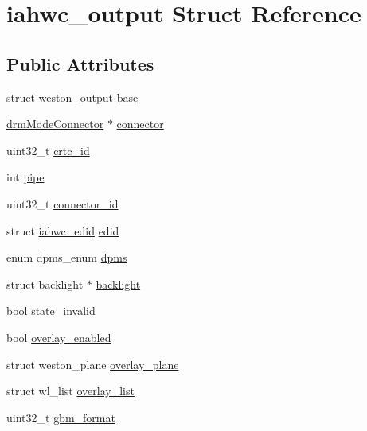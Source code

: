 \hypertarget{structiahwc__output}{}\section{iahwc\+\_\+output Struct Reference}
\label{structiahwc__output}
\subsection*{Public Attributes}
\begin{DoxyCompactItemize}
\item 
struct weston\+\_\+output \mbox{\hyperlink{structiahwc__output_a33611f9c8d1354ea9c4df7c6077f593e}{base}}
\item 
\mbox{\hyperlink{nativedisplay_8h_a16ea3fc6b16060fd1e1257707006440e}{drm\+Mode\+Connector}} $\ast$ \mbox{\hyperlink{structiahwc__output_ab3dc520b844eed75e64c4732b8355f35}{connector}}
\item 
uint32\+\_\+t \mbox{\hyperlink{structiahwc__output_a6e3ab85b62b65859fdb94afd042bfd00}{crtc\+\_\+id}}
\item 
int \mbox{\hyperlink{structiahwc__output_a34e4e1b6d16a36451f45dcd44de71592}{pipe}}
\item 
uint32\+\_\+t \mbox{\hyperlink{structiahwc__output_ae1cf365db62f007f6a3d30bd19b5b0c8}{connector\+\_\+id}}
\item 
struct \mbox{\hyperlink{structiahwc__edid}{iahwc\+\_\+edid}} \mbox{\hyperlink{structiahwc__output_a60fac1882a96e0bb4e1b6a6d14ac9f17}{edid}}
\item 
enum dpms\+\_\+enum \mbox{\hyperlink{structiahwc__output_ae2065bbaeeccc8c9b3515fd3423c808d}{dpms}}
\item 
struct backlight $\ast$ \mbox{\hyperlink{structiahwc__output_a1ebafa94e848666e5f28c124d9b6b72e}{backlight}}
\item 
bool \mbox{\hyperlink{structiahwc__output_a87777ec8691b7e6422bb02a20742f45c}{state\+\_\+invalid}}
\item 
bool \mbox{\hyperlink{structiahwc__output_aefcab2462cfed7d4bdebf45010df3caa}{overlay\+\_\+enabled}}
\item 
struct weston\+\_\+plane \mbox{\hyperlink{structiahwc__output_a2f4e89c3089e28c38b9eda40293e8b62}{overlay\+\_\+plane}}
\item 
struct wl\+\_\+list \mbox{\hyperlink{structiahwc__output_ac6a6632a6b51024f9a2f5516ffedf60b}{overlay\+\_\+list}}
\item 
uint32\+\_\+t \mbox{\hyperlink{structiahwc__output_a2523ed1ef619ab10f9da95c2e7abf731}{gbm\+\_\+format}}

\end{DoxyCompactItemize}
